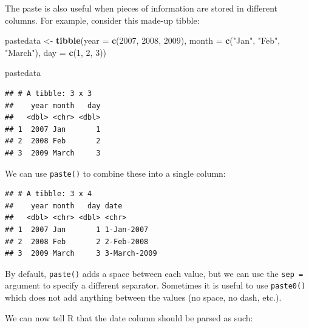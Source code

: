 \documentclass[
  12pt,
  krantz2]{krantz}
\makeatletter
\newenvironment{Shaded}{\begin{snugshade}}{\end{snugshade}}
\newcommand{\DataTypeTok}[1]{\textcolor[rgb]{0.13,0.29,0.53}{#1}}
\newcommand{\DecValTok}[1]{\textcolor[rgb]{0.00,0.00,0.81}{#1}}
\newcommand{\KeywordTok}[1]{\textcolor[rgb]{0.13,0.29,0.53}{\textbf{#1}}}
\newcommand{\NormalTok}[1]{#1}
\newcommand{\OperatorTok}[1]{\textcolor[rgb]{0.81,0.36,0.00}{\textbf{#1}}}
\newcommand{\StringTok}[1]{\textcolor[rgb]{0.31,0.60,0.02}{#1}}
\newenvironment{kframe}{%
\medskip{}
\setlength{\fboxsep}{.8em}
 \def\at@end@of@kframe{}%
 \ifinner\ifhmode%
  \def\at@end@of@kframe{\end{minipage}}%
  \begin{minipage}{\columnwidth}%
 \fi\fi%
 \def\FrameCommand##1{\hskip\@totalleftmargin \hskip-\fboxsep
 \colorbox{shadecolor}{##1}\hskip-\fboxsep
     \hskip-\linewidth \hskip-\@totalleftmargin \hskip\columnwidth}%
 \MakeFramed {\advance\hsize-\width
   \@totalleftmargin\z@ \linewidth\hsize
   \@setminipage}}%
 {\par\unskip\endMakeFramed%
 \at@end@of@kframe}
\renewenvironment{Shaded}{\begin{kframe}}{\end{kframe}}
\makeatother
\begin{document}
The paste is also useful when pieces of information are stored in different columns.
For example, consider this made-up tibble:

\begin{Shaded}
\begin{Highlighting}[]
\NormalTok{pastedata <-}\StringTok{ }\KeywordTok{tibble}\NormalTok{(}\DataTypeTok{year  =} \KeywordTok{c}\NormalTok{(}\DecValTok{2007}\NormalTok{, }\DecValTok{2008}\NormalTok{, }\DecValTok{2009}\NormalTok{),}
                   \DataTypeTok{month =} \KeywordTok{c}\NormalTok{(}\StringTok{"Jan"}\NormalTok{, }\StringTok{"Feb"}\NormalTok{, }\StringTok{"March"}\NormalTok{),}
                   \DataTypeTok{day   =} \KeywordTok{c}\NormalTok{(}\DecValTok{1}\NormalTok{, }\DecValTok{2}\NormalTok{, }\DecValTok{3}\NormalTok{))}

\NormalTok{pastedata}
\end{Highlighting}
\end{Shaded}

\begin{verbatim}
## # A tibble: 3 x 3
##    year month   day
##   <dbl> <chr> <dbl>
## 1  2007 Jan       1
## 2  2008 Feb       2
## 3  2009 March     3
\end{verbatim}

We can use \texttt{paste()} to combine these into a single column:

\begin{Shaded}
\end{Shaded}

\begin{verbatim}
## # A tibble: 3 x 4
##    year month   day date        
##   <dbl> <chr> <dbl> <chr>       
## 1  2007 Jan       1 1-Jan-2007  
## 2  2008 Feb       2 2-Feb-2008  
## 3  2009 March     3 3-March-2009
\end{verbatim}

By default, \texttt{paste()} adds a space between each value, but we can use the \texttt{sep\ =} argument to specify a different separator.
Sometimes it is useful to use \texttt{paste0()} which does not add anything between the values (no space, no dash, etc.).

We can now tell R that the date column should be parsed as such:
\end{document}
